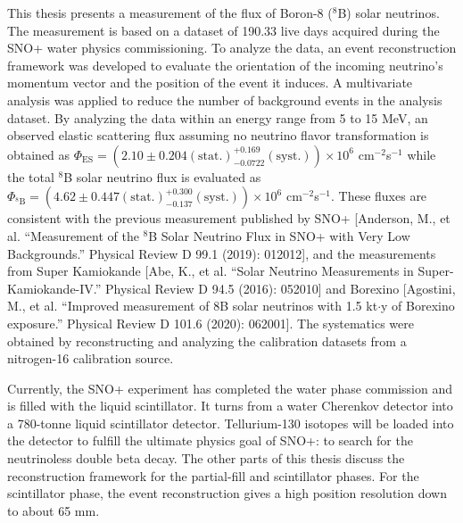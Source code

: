 \begin{doublespacing}
This thesis presents a measurement of the flux of Boron-8 ($^8$B) solar neutrinos. The measurement is based on a dataset of 190.33 live days acquired during the SNO+ water physics commissioning. To analyze the data, an event reconstruction framework was developed to evaluate the orientation of the incoming neutrino's momentum vector and the position of the event it induces. A multivariate analysis was applied to reduce the number of background events in the analysis dataset. By analyzing the data within an energy range from 5 to 15 MeV, an observed elastic scattering flux assuming no neutrino flavor transformation is obtained as $\Phi_{\mathrm{ES}}=(2.10 \pm 0.204 \mathrm{(stat.)}^{+0.169}_{-0.0722}\mathrm{(syst.)})\times10^6$ cm$^{-2}$s$^{-1}$ while the total $^8$B solar neutrino flux is evaluated as $\Phi_{\mathrm{^8B}}=(4.62 \pm 0.447 \mathrm{(stat.)}^{+0.300}_{-0.137}\mathrm{(syst.)})\times10^6$ cm$^{-2}$s$^{-1}$. These fluxes are consistent with the previous measurement published by SNO+ [Anderson, M., et al. ``Measurement of the $^8$B Solar Neutrino Flux in SNO+ with Very Low Backgrounds.'' Physical Review D 99.1 (2019): 012012], and the measurements from Super Kamiokande [Abe, K., et al. ``Solar Neutrino Measurements in Super-Kamiokande-IV.'' Physical Review D 94.5 (2016): 052010] and Borexino [Agostini, M., et al. ``Improved measurement of 8B solar
neutrinos with 1.5 kt$\cdot$y of Borexino exposure.'' Physical Review D 101.6 (2020): 062001]. The systematics were obtained by reconstructing and analyzing the calibration datasets from a nitrogen-16 calibration source.

Currently, the SNO+ experiment has completed the water phase commission and is filled with the liquid scintillator. It turns from a water Cherenkov detector into a 780-tonne liquid scintillator detector. Tellurium-130 isotopes will be loaded into the detector to fulfill the ultimate physics goal of SNO+: to search for the neutrinoless double beta decay. The other parts of this thesis discuss the reconstruction framework for the partial-fill and scintillator phases. For the scintillator phase, the event reconstruction gives a high position resolution down to about 65 mm.


\end{doublespacing}